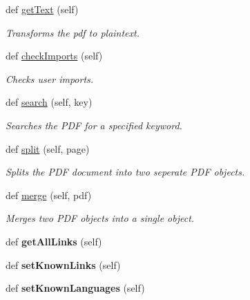\begin{DoxyCompactItemize}
def \hyperlink{classpdfReader_1_1pdfReader_acaff69d078984de8dce0e23198e0e83a}{get\+Text} (self)
\begin{DoxyCompactList}\small\item\em Transforms the pdf to plaintext. \end{DoxyCompactList}\item 
def \hyperlink{classpdfReader_1_1pdfReader_ac4723dad588bceac770ba68cdd09e0e3}{check\+Imports} (self)
\begin{DoxyCompactList}\small\item\em Checks user imports. \end{DoxyCompactList}\item 
def \hyperlink{classpdfReader_1_1pdfReader_abe6cdb3300ed8e8d541eeb181e6d2442}{search} (self, key)
\begin{DoxyCompactList}\small\item\em Searches the P\+DF for a specified keyword. \end{DoxyCompactList}\item 
def \hyperlink{classpdfReader_1_1pdfReader_a776e5464f4d9d5f1e2164810e50e471b}{split} (self, page)
\begin{DoxyCompactList}\small\item\em Splits the P\+DF document into two seperate P\+DF objects. \end{DoxyCompactList}\item 
def \hyperlink{classpdfReader_1_1pdfReader_af1b3ff3aa7d88847a9faa825d0917384}{merge} (self, pdf)
\begin{DoxyCompactList}\small\item\em Merges two P\+DF objects into a single object. \end{DoxyCompactList}\item 
\mbox{\label{classpdfReader_1_1pdfReader_a65c226e69ba5d065fc077ca2712e367e}} 
def {\bfseries get\+All\+Links} (self)
\item 
\mbox{\label{classpdfReader_1_1pdfReader_a031d2b4943024db8c954677b39d54022}} 
def {\bfseries set\+Known\+Links} (self)
\item 
\mbox{\label{classpdfReader_1_1pdfReader_af037ce9b5f9229f8b1ffaadba0af3aa0}} 
def {\bfseries set\+Known\+Languages} (self)
\end{DoxyCompactItemize}
